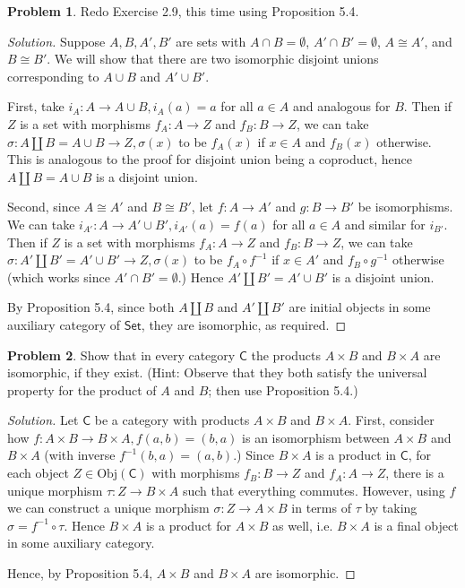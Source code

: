 \documentclass[fontsize=14pt]{scrartcl}
\theoremstyle{definition}
\newtheorem{problem-internal}{Problem}[subsection]
\newenvironment{problem}{
  \medskip
  \begin{problem-internal}
}{
  \end{problem-internal}
}
\newenvironment{solution}{
  \begin{proof}[Solution]
  \vspace{-8px}
  \setlength{\parskip}{4px}
  \setlength{\parindent}{0px}
}{
  \end{proof}
}
\newcommand{\Obj}{\mathrm{Obj}}
\begin{document}
\begin{problem}
Redo Exercise 2.9, this time using Proposition 5.4.
\end{problem}
\begin{solution}
\def \Set {\mathsf{Set}}
Suppose $A,B,A',B'$ are sets with $A\cap B=\emptyset$, $A'\cap B'=\emptyset$,
$A\cong A'$, and $B\cong B'$. We will show that there are two isomorphic
disjoint unions corresponding to $A\cup B$ and $A'\cup B'$.

First, take $i_A:A\to A\cup B, i_A(a) = a$ for all $a\in A$ and analogous for
$B$. Then if $Z$ is a set with morphisms $f_A:A\to Z$ and $f_B:B\to Z$, we can
take $\sigma:A\amalg B=A\cup B\to Z, \sigma(x)$ to be $f_A(x)$ if $x\in A$ and
$f_B(x)$ otherwise. This is analogous to the proof for disjoint union being a
coproduct, hence $A\amalg B=A\cup B$ is a disjoint union.

Second, since $A\cong A'$ and $B\cong B'$, let $f:A\to A'$ and $g:B\to B'$ be
isomorphisms. We can take $i_{A'}: A\to A'\cup B',i_{A'}(a) = f(a)$ for all
$a\in A$ and similar for $i_{B'}$. Then if $Z$ is a set with morphisms $f_A:A\to
Z$ and $f_B:B\to Z$, we can take $\sigma:A'\amalg B'=A'\cup B'\to Z, \sigma(x)$
to be $f_A\circ f^{-1}$ if $x\in A'$ and $f_B\circ g^{-1}$ otherwise (which
works since $A'\cap B'=\emptyset$.) Hence $A'\amalg B'=A'\cup B'$ is a disjoint
union.

By Proposition 5.4, since both $A\amalg B$ and $A'\amalg B'$ are initial objects
in some auxiliary category of $\Set$, they are isomorphic, as required.
\end{solution}


\begin{problem}
\def \C {\mathsf{C}}
Show that in every category $\C$ the products $A\times B$ and $B\times A$ are
isomorphic, if they exist. (Hint: Observe that they both satisfy the universal
property for the product of $A$ and $B$; then use Proposition 5.4.)
\end{problem}
\begin{solution}
\def \C {\mathsf{C}}
Let $\C$ be a category with products $A\times B$ and $B\times A$. First,
consider how $f:A\times B\to B\times A, f(a,b) = (b,a)$ is an isomorphism
between $A\times B$ and $B\times A$ (with inverse $f^{-1}(b,a) = (a,b)$.) Since
$B\times A$ is a product in $\C$, for each object $Z\in\Obj(\C)$ with morphisms
$f_B:B\to Z$ and $f_A:A\to Z$, there is a unique morphism $\tau:Z\to B\times A$
such that everything commutes. However, using $f$ we can construct a unique
morphism $\sigma:Z\to A\times B$ in terms of $\tau$ by taking $\sigma =
f^{-1}\circ\tau$. Hence $B\times A$ is a product for $A\times B$ as well, i.e.
$B\times A$ is a final object in some auxiliary category.

Hence, by Proposition 5.4, $A\times B$ and $B\times A$ are isomorphic.
\end{solution}
\end{document}
